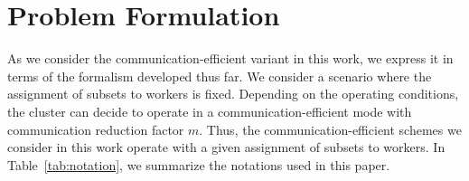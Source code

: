 \documentclass[journal,draftcls,onecolumn]{IEEEtran}
\theoremstyle{mystyle}
\begin{document}


\section{Problem Formulation}
\label{sec:prob_form}
 
As we consider the communication-efficient variant in this work, we express it in terms of the formalism developed thus far.  We consider a scenario where the assignment of subsets to workers is fixed. Depending on the operating conditions, the cluster can decide to operate in a communication-efficient mode with communication reduction factor $m$. Thus, the communication-efficient schemes we consider in this work operate with a given assignment of subsets to workers. In Table~\ref{tab:notation}, we summarize the notations used in this paper. 
\end{document}
